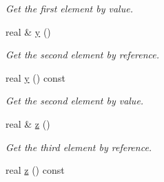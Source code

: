 \begin{DoxyCompactItemize}
\begin{DoxyCompactList}\small\item\em \-Get the first element by value. \end{DoxyCompactList}\item 
\hypertarget{class_point_abdedcae417002d4e747b876a346a5062}{real \& \hyperlink{class_point_abdedcae417002d4e747b876a346a5062}{y} ()}\label{class_point_abdedcae417002d4e747b876a346a5062}

\begin{DoxyCompactList}\small\item\em \-Get the second element by reference. \end{DoxyCompactList}\item 
\hypertarget{class_point_ad4dc38edfea288dbfed132cf5ce3830a}{real \hyperlink{class_point_ad4dc38edfea288dbfed132cf5ce3830a}{y} () const }\label{class_point_ad4dc38edfea288dbfed132cf5ce3830a}

\begin{DoxyCompactList}\small\item\em \-Get the second element by value. \end{DoxyCompactList}\item 
\hypertarget{class_point_a70f81bbcc60b59191dba261ec8bee87e}{real \& \hyperlink{class_point_a70f81bbcc60b59191dba261ec8bee87e}{z} ()}\label{class_point_a70f81bbcc60b59191dba261ec8bee87e}

\begin{DoxyCompactList}\small\item\em \-Get the third element by reference. \end{DoxyCompactList}\item 
\hypertarget{class_point_ae344dd16dddf7ae80f665f085874fd55}{real \hyperlink{class_point_ae344dd16dddf7ae80f665f085874fd55}{z} () const }\label{class_point_ae344dd16dddf7ae80f665f085874fd55}


\end{DoxyCompactItemize}
